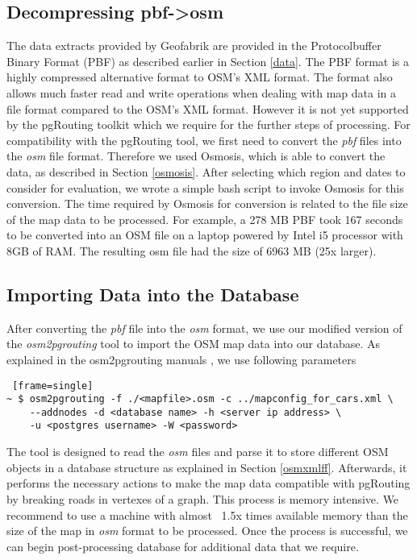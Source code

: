 \subsection{Decompressing pbf->osm}
The data extracts provided by Geofabrik are provided in the Protocolbuffer Binary Format (PBF) \cite{osmpbf} as described earlier in Section \ref{data}. The PBF format is a highly compressed alternative format to OSM's XML format. The format also allows much faster read and write operations when dealing with map data in a file format compared to the OSM's XML format. However it is not yet supported by the pgRouting toolkit which we require for the further steps of processing. For compatibility with the pgRouting tool, we first need to convert the \textit{pbf} files into the \textit{osm} file format. Therefore we used Osmosis, which is able to convert the data, as described in Section \ref{osmosis}. After selecting which region and dates to consider for evaluation, we wrote a simple bash script to invoke Osmosis for this conversion. The time required by Osmosis for conversion is related to the file size of the map data to be processed. For example, a 278 MB PBF took 167 seconds to be converted into an OSM file on a laptop powered by Intel i5 processor with 8GB of RAM. The resulting osm file had the size of 6963 MB (25x larger).
\subsection{Importing Data into the Database}
After converting the \textit{pbf} file into the \textit{osm} format, we use our modified version of the \textit{osm2pgrouting} tool to import the OSM map data into our database. As explained in the osm2pgrouting manuals \cite{osm2pgrouting}, we use following parameters 
\begin{lstlisting} [frame=single]
~ $ osm2pgrouting -f ./<mapfile>.osm -c ../mapconfig_for_cars.xml \
    --addnodes -d <database name> -h <server ip address> \
    -u <postgres username> -W <password>
\end{lstlisting}

The tool is designed to read the \textit{osm} files and parse it to store different OSM objects in a database structure as explained in Section \ref{osmxmlff}. Afterwards, it performs the necessary actions to make the map data compatible with pgRouting by breaking roads in vertexes of a graph. This process is memory intensive. We recommend to use a machine with almost ~1.5x times available memory than the size of the map in \textit{osm} format to be processed. Once the process is successful, we can begin post-processing database for additional data that we require. 
